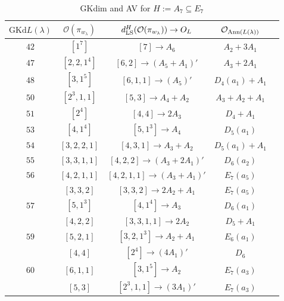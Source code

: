 \documentclass[reqno,12pt]{amsart}
\numberwithin{equation}{section}
\theoremstyle{plain}
\theoremstyle{definition}
\newcommand{\lam}{\lambda}
\renewcommand{\subset}{\subseteq}
\begin{document}
\begin{table}[htbp]\caption{ GKdim and AV for $H:=A_7\subset E_7$}
	\label{taba7}
	\centering
	\renewcommand{\arraystretch}{1.5}
	\setlength\tabcolsep{5pt}
	
	\begin{tabular}{|c|c|c|c|c|}
		\hline $\mathrm{GKd} L(\lambda)$ &     $\mathcal{O}({\pi_{w_{\lam}}})$& $d_{\rm LS}^{H}(\mathcal{O}(\pi_{w_\lambda}))\rightarrow O_{L}$ & $\mathcal{O}_{{\rm Ann}(L(\lambda))}$ \\ \hline
$42$ 
&  $ [1^7]$  &{$[7]\rightarrow A_6$  }&   $A_2+3A_1$ \\
\hline

$47$ 
&  $ [2,2,1^4]$  &{$[6,2]\rightarrow (A_5+A_1)'$  }&   $A_3+2A_1$ \\
\hline

$48$ 
&  $ [3,1^5]$  &{$[6,1,1]\rightarrow (A_5)'$ }&   $D_4(a_1)+A_1$ \\
\hline


$50$ 
&  $ [2^3,1,1]$  &$[5,3]\rightarrow A_4+A_2$  &   $A_3+A_2+A_1$ \\
\hline


$51$ 
&  $ [2^4]$  &$[4,4]\rightarrow 2A_3$  &   $D_4+A_1$ \\
\hline

$53$ 
&  $ [4,1^4]$  &$[5,1^3]\rightarrow A_4$  &   $D_5(a_1)$ \\
\hline

$54$ 
&  $ [3,2,2,1]$  &$[4,3,1]\rightarrow A_3+A_2$  &   $D_5(a_1)+A_1$ \\
\hline

$55$ 
&  $ [3,3,1,1]$  &$[4,2,2]\rightarrow (A_3+2A_1)'$  &   $D_6(a_2)$ \\
\hline

$56$ 
&  $ [4,2,1,1]$  &$[4,2,1,1]\rightarrow (A_3+A_1)'$  &   $E_7(a_5)$ \\
& $ [3,3,2]$  &$[3,3,2]\rightarrow 2A_2+A_1$  &   $E_7(a_5)$ \\
\hline

$57$ 
&  $ [5,1^3]$  &$[4,1^4]\rightarrow A_3$  &   $D_6(a_1)$ \\
& $ [4,2,2]$  &$[3,3,1,1]\rightarrow 2A_2$  &   $D_5+A_1$ \\
\hline

$59$ 
&  $ [5,2,1]$  &$[3,2,1^3]\rightarrow A_2+A_1$  &   $E_6(a_1)$ \\
& $ [4,4]$  &$[2^4]\rightarrow (4A_1)'$  &   $D_6$ \\
\hline

$60$ 
&  $ [6,1,1]$  &$[3,1^5]\rightarrow A_2$  &   $E_7(a_3)$ \\
&  $ [5,3]$  &$[2^3,1,1]\rightarrow (3A_1)'$   &   $E_7(a_3)$  \\
\hline



\end{tabular}
	\bigskip
	
\end{table}
\end{document}

